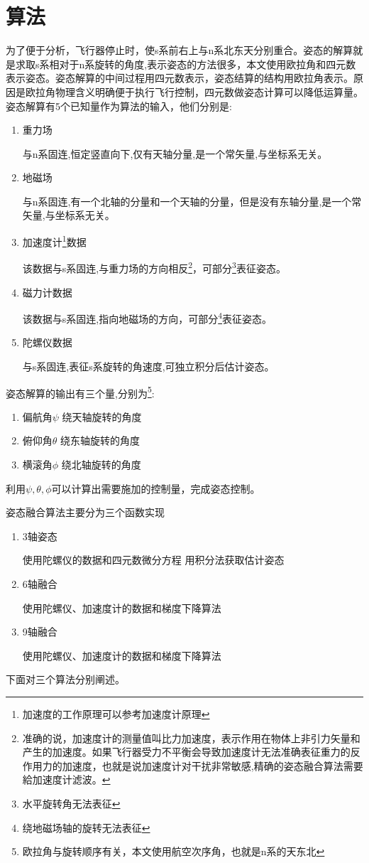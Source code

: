 \documentclass[12pt,a4paper]{article}
\begin{document}
\section{算法}
为了便于分析，飞行器停止时，使s系前右上与n系北东天分别重合。姿态的解算就是求取s系相对于n系旋转的角度,表示姿态的方法很多，本文使用欧拉角和四元数表示姿态。姿态解算的中间过程用四元数表示，姿态结算的结构用欧拉角表示。原因是欧拉角物理含义明确便于执行飞行控制，四元数做姿态计算可以降低运算量。
姿态解算有5个已知量作为算法的输入，他们分别是:
\begin{enumerate}
    \item 重力场

        与n系固连,恒定竖直向下,仅有天轴分量,是一个常矢量,与坐标系无关。
    \item 地磁场

        与n系固连,有一个北轴的分量和一个天轴的分量，但是没有东轴分量,是一个常矢量,与坐标系无关。
    \item 加速度计\footnote{加速度的工作原理可以参考加速度计原理\cite{加速度计原理}}数据

        该数据与s系固连,与重力场的方向相反\footnote{准确的说，加速度计的测量值叫比力加速度，表示作用在物体上非引力矢量和产生的加速度。如果飞行器受力不平衡会导致加速度计无法准确表征重力的反作用力的加速度，也就是说加速度计对干扰非常敏感,精确的姿态融合算法需要給加速度计滤波。}，可部分\footnote{水平旋转角无法表征}表征姿态。
    \item 磁力计数据

        该数据与s系固连,指向地磁场的方向，可部分\footnote{绕地磁场轴的旋转无法表征}表征姿态。
    \item 陀螺仪数据

        与s系固连,表征s系旋转的角速度,可独立积分后估计姿态。
\end{enumerate}
姿态解算的输出有三个量,分别为\footnote{欧拉角与旋转顺序有关，本文使用航空次序角，也就是n系的天东北}:
\begin{enumerate}
    \item 偏航角$\psi$
        绕天轴旋转的角度
    \item 俯仰角$\theta$
        绕东轴旋转的角度
    \item 横滚角$\phi$
        绕北轴旋转的角度
\end{enumerate}
利用$\psi,\theta,\phi$可以计算出需要施加的控制量，完成姿态控制。

姿态融合算法主要分为三个函数实现
\begin{enumerate}
    \item 3轴姿态

        使用陀螺仪的数据和四元数微分方程 用积分法获取估计姿态
    \item 6轴融合

        使用陀螺仪、加速度计的数据和梯度下降算法
    \item 9轴融合

        使用陀螺仪、加速度计的数据和梯度下降算法
\end{enumerate}
下面对三个算法分别阐述。
\end{document}
